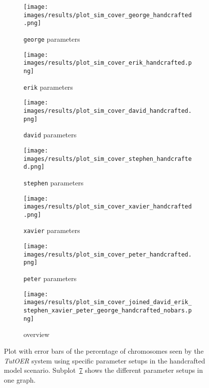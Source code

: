 \begin{figure}[ht]
	\begin{subfigure}{0.48\linewidth}
	\texttt{[image: images/results/plot\_sim\_cover\_george\_handcrafted.png]}
	\caption{\texttt{george} parameters}
	\label{fig:cover_handcrafted_george}
	\end{subfigure}
	\hfill
	\begin{subfigure}{0.48\linewidth}
	\texttt{[image: images/results/plot\_sim\_cover\_erik\_handcrafted.png]}
	\caption{\texttt{erik} parameters}
	\label{fig:cover_handcrafted_erik}
	\end{subfigure}
	\begin{subfigure}{0.48\linewidth}
	\texttt{[image: images/results/plot\_sim\_cover\_david\_handcrafted.png]}
	\caption{\texttt{david} parameters}
	\label{fig:cover_handcrafted_david}
	\end{subfigure}
	\hfill
	\begin{subfigure}{0.48\linewidth}
	\texttt{[image: images/results/plot\_sim\_cover\_stephen\_handcrafted.png]}
	\caption{\texttt{stephen} parameters}
	\label{fig:cover_handcrafted_stephen}
	\end{subfigure}
	\begin{subfigure}{0.48\linewidth}
	\texttt{[image: images/results/plot\_sim\_cover\_xavier\_handcrafted.png]}
	\caption{\texttt{xavier} parameters}
	\label{fig:cover_handcrafted_xavier}
	\end{subfigure}
	\hfill
	\begin{subfigure}{0.48\linewidth}
	\texttt{[image: images/results/plot\_sim\_cover\_peter\_handcrafted.png]}
	\caption{\texttt{peter} parameters}
	\label{fig:cover_handcrafted_peter}
	\end{subfigure}
	\begin{subfigure}{\linewidth}
	\texttt{[image: images/results/plot\_sim\_cover\_joined\_david\_erik\_stephen\_xavier\_peter\_george\_handcrafted\_nobars.png]}
	\caption{overview}
	\label{fig:cover_handcrafted_overview_group1}
	\end{subfigure}
	\caption{Plot with error bars of the percentage of chromosomes seen by the \emph{TutOER}
	system using specific parameter setups in the handcrafted model scenario.
	Subplot~\ref{fig:cover_handcrafted_overview_group1} shows the
	different parameter setups in one graph.}
	\label{fig:cover_handcrafted_container_group1}
\end{figure}

